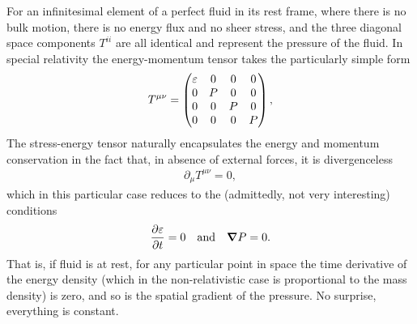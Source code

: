 For an infinitesimal element of a perfect fluid in its rest frame, where there is
no bulk motion, there is no energy flux and no sheer stress, and the three diagonal
space components $T^{ii}$ are all identical and represent the pressure of the fluid.
In special relativity the energy-momentum tensor takes the particularly simple
form
\begin{align}\label{eq:energy_momentum_tensor_sr_rest}
  T^{\mu\nu} =
  \begin{pmatrix}
    \varepsilon & 0 & 0 & 0\\
    0 & P & 0 & 0\\
    0 & 0 & P & 0\\
    0 & 0 & 0 & P \\
  \end{pmatrix},
\end{align}
The stress-energy tensor naturally encapsulates the energy and momentum conservation
in the fact that, in absence of external forces, it is divergenceless
\begin{align}
  \partial_\mu T^{\mu\nu} = 0,
\end{align}
which in this particular case reduces to the (admittedly, not very interesting)
conditions
\begin{align*}
  \pdv{\varepsilon}{t} = 0 \quad\text{and}\quad
  \grad{\ensuremath{P}} = 0.
\end{align*}
That is, if fluid is at rest, for any particular point in space the time derivative
of the energy density (which in the non-relativistic case is proportional to the
mass density) is zero, and so is the spatial gradient of the pressure. No surprise,
everything is constant.

